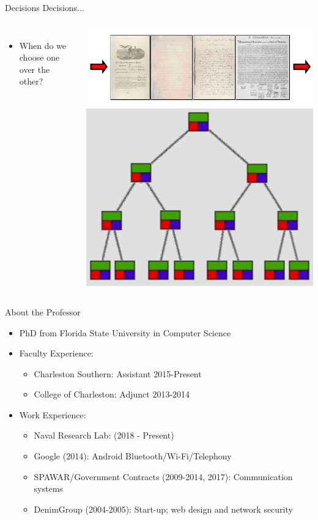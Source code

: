 \documentclass{beamer}
\begin{document}
\begin{frame}{Decisions Decisions...}
\begin{columns}[c]
\begin{itemize}
\item When do we choose one over the other?
\end{itemize}
\includegraphics[width=1.0\textwidth]{../imgs/queue.png}
\includegraphics[width=1.0\textwidth]{../imgs/binary-tree-color.png}
\end{columns}
\end{frame}

\begin{frame}{About the Professor}
\begin{itemize}
\item PhD from Florida State University in Computer Science
\item Faculty Experience:
\begin{itemize}
\item Charleston Southern: Assistant 2015-Present
\item College of Charleston: Adjunct 2013-2014
\end{itemize}
\item Work Experience:
\begin{itemize}
\item Naval Research Lab: (2018 - Present)
\item Google (2014): Android Bluetooth/Wi-Fi/Telephony
\item SPAWAR/Government Contracts (2009-2014, 2017): Communication systems
\item DenimGroup (2004-2005): Start-up; web design and network security
\end{itemize}
\end{itemize}
\end{frame}
\end{document}
